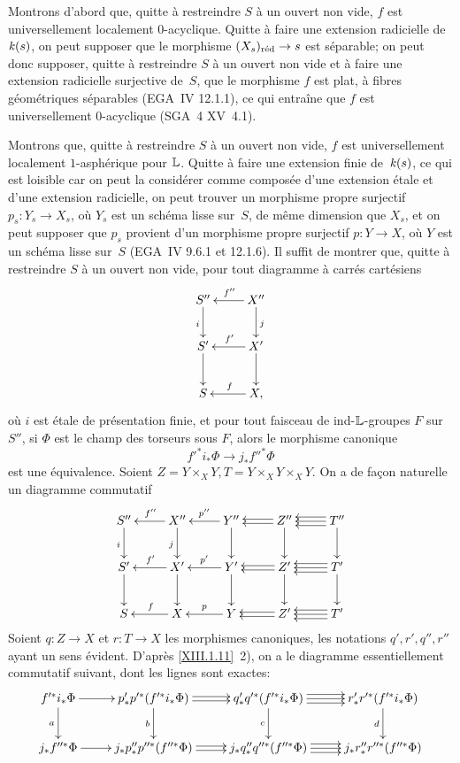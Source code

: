 Montrons d'abord que, quitte \`a restreindre $S$ \`a un ouvert non
vide, $f$ est universellement localement $0$-acyclique. Quitte \`a
faire une extension radicielle de~$\mathit{k}(s)$, on peut supposer que le
morphisme $(X_s)_\red\to s$ est s\'eparable; on peut donc supposer,
quitte \`a restreindre $S$ \`a un ouvert non vide et \`a faire
une extension radicielle surjective de~$S$, que le morphisme $f$ est
plat, \`a fibres g\'eom\'etriques s\'eparables (EGA~IV
12.1.1), ce qui entra\^ine que $f$ est universellement
$0$-acyclique (SGA~4 XV~4.1).

Montrons que, quitte \`a restreindre $S$ \`a un ouvert non vide,
$f$ est universellement localement $1$-asph\'erique pour
$\mathbb{L}$. Quitte \`a faire une
extension finie de~$\mathit{k}(s)$, ce qui est loisible car on peut la
consid\'erer comme compos\'ee d'une extension \'etale et d'une
extension radicielle, on peut trouver un morphisme propre surjectif
$p_s\colon Y_s\to X_s$, o\`u $Y_s$ est un sch\'ema lisse sur~$S$,
de m\^eme dimension que $X_s$, et on peut supposer que $p_s$
provient d'un morphisme propre surjectif $p\colon Y\to X$, o\`u $Y$
est un sch\'ema lisse sur~$S$ (EGA~IV 9.6.1 et 12.1.6). Il suffit de
montrer que, quitte \`a restreindre $S$ \`a un ouvert non vide,
pour tout diagramme \`a carr\'es cart\'esiens
$$
\xymatrix{{S''}\ar[d]_i&{X ''}\ar[d]^j\ar[l]_{f''}\\{S'}\ar[d]&{X'}\ar[d]\ar[l]_{f'}\\{S}&{X,}\ar[l]_f}
$$
o\`u $i$ est \'etale de pr\'esentation finie, et pour tout
faisceau de ind-$\mathbb{L}$-groupes $F$ sur~$S''$, si $\Phi$ est le champ
des torseurs sous $F$, alors le morphisme canonique
$$
{f'}^*i_*\Phi \to j_*{f''}^*\Phi
$$
est une \'equivalence. Soient $Z=Y\times_{X}Y,
T=Y\times_{X}Y\times_{X}Y$. On a de fa\c con naturelle un diagramme
commutatif
$$
\xymatrix{{S''}\ar[d]_i&{X''}\ar[l]_{f''}\ar[d]_j&{Y''}\ar[l]_{p''}\ar[d]&{Z''}\ar[d]\ar@<-.4ex>[l]\ar@<.4ex>[l]&{T''}\ar[d]\ar[l]\ar@<-.8ex>[l]\ar@<.8ex>[l]\\{S'}\ar[d]&{X'}\ar[l]_{f'}\ar[d]&{Y'}\ar[d]\ar[l]_{p'}&{Z'}\ar[d]\ar@<-.4ex>[l]\ar@<.4ex>[l]&{T'}\ar[d]\ar[l]\ar@<-.8ex>[l]\ar@<.8ex>[l]\\{S}&{X}\ar[l]_f&{Y}\ar[l]_p&{Z'}\ar@<-.4ex>[l]\ar@<.4ex>[l]&{T'}\ar[l]\ar@<-.8ex>[l]\ar@<.8ex>[l]}
$$
Soient
$q\colon Z\to X$ et $r\colon T\to X$ les morphismes canoniques,
les notations $q', r', q'', r''$ ayant un sens
\'evident. D'apr\`es \ref{XIII.1.11}~2), on a le diagramme
essentiellement commutatif suivant, dont les lignes sont exactes:
$$
\xymatrix{{f'^* i_*\Phi}\ar[r]\ar[d]_a&{p'_*p'^*(f'^*i_*\Phi)}\ar[d]_b\ar@<-.4ex>[r]\ar@<.4ex>[r]&{q'_*q'^*(f'^*i_*\Phi)}\ar[d]_c\ar[r]\ar@<-.8ex>[r]\ar@<.8ex>[r]&{r'_*r'^*(f'^*i_*\Phi)}\ar[d]_d\\{j_*f''^*\Phi}\ar[r]&{j_*p''_*p''^*(f''^*\Phi)}\ar@<-.4ex>[r]\ar@<.4ex>[r]&{j_*q''_*q''^*(f''^*\Phi)}\ar[r]\ar@<-.8ex>[r]\ar@<.8ex>[r]&{j_*r''_*r''^*(f''^*\Phi)}}
$$
